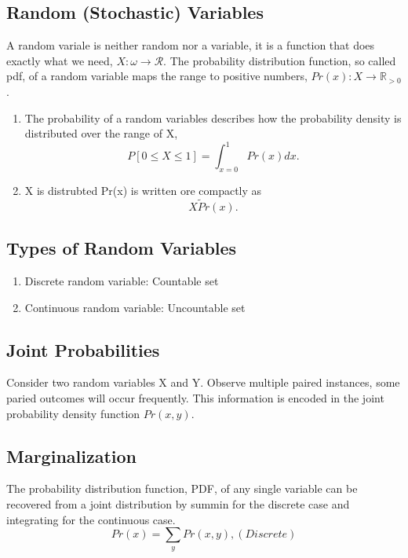 \documentclass[12pt]{article}
\numberwithin{equation}{section}
\begin{document}
\subsection{Random (Stochastic) Variables}
A random variale is neither random nor a variable, it is a function that does exactly what we need, $X: \omega \to \mathcal{R}$.
The probability distribution function, so called pdf, of a random variable maps the range to positive numbers, $Pr(x): X \to \mathbb{R}_{>0}$.
\begin{enumerate}
    \item The probability of a random variables describes how the probability density is distributed over the range of X,
    \begin{equation}
        P[0 \leq X \leq 1] = \int_{x = 0}^1 Pr(x) dx.
    \end{equation}
    \item X is distrubted Pr(x) is written ore compactly as 
    \begin{equation}
        X \tilde Pr(x).
    \end{equation}
\end{enumerate}
\subsection{Types of Random Variables}
\begin{enumerate}
    \item Discrete random variable: Countable set
    \item Continuous random variable: Uncountable set
\end{enumerate}
\subsection{Joint Probabilities}
Consider two random variables X and Y. Observe multiple paired instances, some paried outcomes will occur frequently. This information is encoded in the joint probability density function $Pr(x,y)$.
\subsection{Marginalization}
The probability distribution function, PDF, of any single variable can be recovered from a joint distribution by summin for the discrete case and integrating for the continuous case.
\begin{equation}
    Pr(x) = \sum_y Pr(x,y), (Discrete)
\end{equation}
\end{document}
